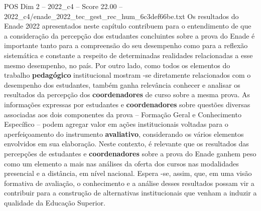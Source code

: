 \begin{textsample}{POS Dim 2 – 2022\_c4 – Score 22.00 – 2022\_c4/enade\_2022\_tec\_gest\_rec\_hum\_6c3def66be.txt}
Os resultados do Enade 2022 apresentados neste capítulo contribuem para o entendimento de que a consideração da percepção dos estudantes concluintes sobre a prova do Enade é importante tanto para a compreensão do seu desempenho como para a reflexão sistemática e constante a respeito de determinadas realidades relacionadas a esse mesmo desempenho, no país.
Por outro lado, como todos os elementos do trabalho \textbf{pedagógico} institucional mostram -se diretamente relacionados com o desempenho dos estudantes, também ganha relevância conhecer e analisar os resultados da percepção dos \textbf{coordenadores} de curso sobre a mesma prova.
As informações expressas por estudantes e \textbf{coordenadores} sobre questões diversas associadas aos dois componentes da prova – Formação Geral e Conhecimento Específico – podem agregar valor em ações institucionais voltadas para o aperfeiçoamento do instrumento \textbf{avaliativo}, considerando os vários elementos envolvidos em sua elaboração.
Neste contexto, é relevante que os resultados das percepções de estudantes e \textbf{coordenadores} sobre a prova do Enade ganhem peso como um elemento a mais nas análises da oferta dos cursos nas modalidades presencial e a distância, em nível nacional.
Espera -se, assim, que, em uma visão formativa de avaliação, o conhecimento e a análise desses resultados possam vir a contribuir para a construção de alternativas institucionais que venham a induzir a qualidade da Educação Superior.

\end{textsample}
